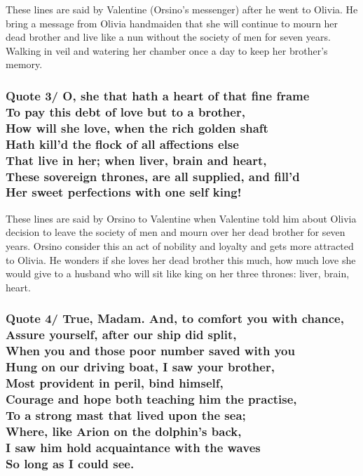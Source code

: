 \documentclass[12pt, a4paper]{article}
\begin{document}
These lines are said by Valentine (Orsino's messenger) after he went
to Olivia. He bring a message from Olivia handmaiden that she will 
continue to mourn her dead brother and live like a nun without the 
society of men for seven years. Walking in veil and watering her 
chamber once a day to keep her brother's memory.

\subsubsection*{Quote 3/
  O, she that hath a heart of that fine frame\\
  To pay this debt of love but to a brother,\\
	How will she love, when the rich golden shaft\\
	Hath kill'd the flock of all affections else\\
	That live in her; when liver, brain and heart,\\
	These sovereign thrones, are all supplied, and fill'd\\
	Her sweet perfections with one self king!
}

These lines are said by Orsino to Valentine when Valentine told him
about Olivia decision to leave the society of men and mourn over her
dead brother for seven years. Orsino consider this an act of nobility and
loyalty and gets more attracted to Olivia. He wonders if she loves her
dead brother this much, how much love she would give to a husband who 
will sit like king on her three thrones: liver, brain, heart.

\subsubsection*{Quote 4/
  True, Madam. And, to comfort you with chance,\\
  Assure yourself, after our ship did split,\\
	When you and those poor number saved with you	\\
	Hung on our driving boat, I saw your brother,\\
	Most provident in peril, bind himself,\\
	Courage and hope both teaching him the practise,\\
	To a strong mast that lived upon the sea;\\
	Where, like Arion on the dolphin's back,\\
	I saw him hold acquaintance with the waves\\
	So long as I could see.
}
\end{document}

